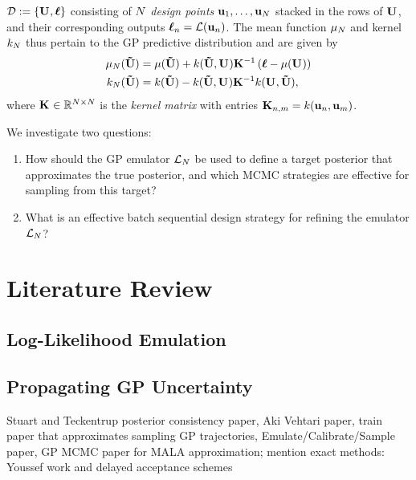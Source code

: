 \documentclass[12pt]{article}
\begin{document}
$\designData := \{\designMat[], \designOutLik\}$ consisting of $\Ndesign$ \textit{design points} 
$\bpar_1, \dots, \bpar_{\Ndesign}$ stacked in the rows of $\designMat[]$, and their corresponding outputs $\designOutLik_{\designIdx} = \llik(\bpar_{\designIdx})$. The 
mean function $\GPMeanPred[\Ndesign]$ and kernel $\GPKerPred[\Ndesign]$ thus pertain to the GP predictive distribution and are given by 
\begin{align}
\GPMeanPred[\Ndesign](\newInputMat) &= \GPMean(\newInputMat) + \GPKer(\newInputMat, \designMat[]) \KerMat[]^{-1} \left(\designOutLik - \GPMean(\designMat[]) \right) \label{kriging_eqns} \\
\GPKerPred[\Ndesign](\newInputMat) &= \GPKer(\newInputMat) - \GPKer(\newInputMat, \designMat[]) \KerMat[]^{-1} \GPKer(\designMat[], \newInputMat),
\end{align}
where $\KerMat[] \in \R^{\Ndesign \times \Ndesign}$ is the \textit{kernel matrix} with entries $\KerMat[n,m] = \GPKer(\bpar_n, \bpar_m)$. 

We investigate two questions: 
\begin{enumerate}
\item How should the GP emulator $\llik_{\Ndesign}$ be used to define a target posterior that approximates the true posterior, and which MCMC 
strategies are effective for sampling from this target?
\item What is an effective batch sequential design strategy for refining the emulator $\llik_{\Ndesign}$? 
\end{enumerate}

\section{Literature Review}

\subsection{Log-Likelihood Emulation}

\subsection{Propagating GP Uncertainty}
Stuart and Teckentrup posterior consistency paper, Aki Vehtari paper, train paper that approximates sampling GP trajectories, Emulate/Calibrate/Sample paper, 
GP MCMC paper for MALA approximation; mention exact methods: Youssef work and delayed acceptance schemes 
\end{document}
